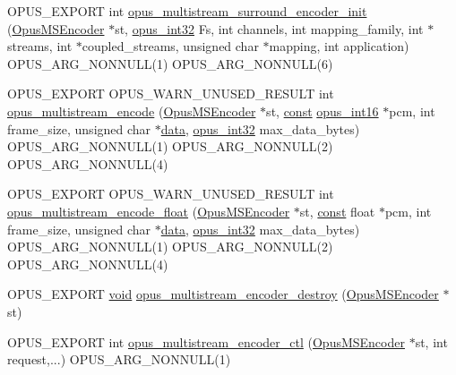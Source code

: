 \begin{DoxyCompactItemize}
\item 
O\+P\+U\+S\+\_\+\+E\+X\+P\+O\+RT int \hyperlink{group__opus__multistream_ga786d90cfe8f8b8f371b0137ac76b1559}{opus\+\_\+multistream\+\_\+surround\+\_\+encoder\+\_\+init} (\hyperlink{group__opus__multistream_gae5826674d142fc873ebc1d781c507dd7}{Opus\+M\+S\+Encoder} $\ast$st, \hyperlink{opus__types_8h_aa4d309d6f80b99dbabebc8f98879ab9a}{opus\+\_\+int32} Fs, int channels, int mapping\+\_\+family, int $\ast$streams, int $\ast$coupled\+\_\+streams, unsigned char $\ast$mapping, int application) O\+P\+U\+S\+\_\+\+A\+R\+G\+\_\+\+N\+O\+N\+N\+U\+LL(1) O\+P\+U\+S\+\_\+\+A\+R\+G\+\_\+\+N\+O\+N\+N\+U\+LL(6)
\item 
O\+P\+U\+S\+\_\+\+E\+X\+P\+O\+RT O\+P\+U\+S\+\_\+\+W\+A\+R\+N\+\_\+\+U\+N\+U\+S\+E\+D\+\_\+\+R\+E\+S\+U\+LT int \hyperlink{group__opus__multistream_ga5276a2212541e65624f52e906d3dff42}{opus\+\_\+multistream\+\_\+encode} (\hyperlink{group__opus__multistream_gae5826674d142fc873ebc1d781c507dd7}{Opus\+M\+S\+Encoder} $\ast$st, \hyperlink{zconf_8h_a2c212835823e3c54a8ab6d95c652660e}{const} \hyperlink{opus__types_8h_acc9ed7cf60479eb81f9648c6ec27dc26}{opus\+\_\+int16} $\ast$pcm, int frame\+\_\+size, unsigned char $\ast$\hyperlink{jpeglib_8h_aa379dc8ae39e55ae0c431a61a7d2f2bc}{data}, \hyperlink{opus__types_8h_aa4d309d6f80b99dbabebc8f98879ab9a}{opus\+\_\+int32} max\+\_\+data\+\_\+bytes) O\+P\+U\+S\+\_\+\+A\+R\+G\+\_\+\+N\+O\+N\+N\+U\+LL(1) O\+P\+U\+S\+\_\+\+A\+R\+G\+\_\+\+N\+O\+N\+N\+U\+LL(2) O\+P\+U\+S\+\_\+\+A\+R\+G\+\_\+\+N\+O\+N\+N\+U\+LL(4)
\item 
O\+P\+U\+S\+\_\+\+E\+X\+P\+O\+RT O\+P\+U\+S\+\_\+\+W\+A\+R\+N\+\_\+\+U\+N\+U\+S\+E\+D\+\_\+\+R\+E\+S\+U\+LT int \hyperlink{group__opus__multistream_gabc78b732d2e7b6ceb27c63888255ef56}{opus\+\_\+multistream\+\_\+encode\+\_\+float} (\hyperlink{group__opus__multistream_gae5826674d142fc873ebc1d781c507dd7}{Opus\+M\+S\+Encoder} $\ast$st, \hyperlink{zconf_8h_a2c212835823e3c54a8ab6d95c652660e}{const} float $\ast$pcm, int frame\+\_\+size, unsigned char $\ast$\hyperlink{jpeglib_8h_aa379dc8ae39e55ae0c431a61a7d2f2bc}{data}, \hyperlink{opus__types_8h_aa4d309d6f80b99dbabebc8f98879ab9a}{opus\+\_\+int32} max\+\_\+data\+\_\+bytes) O\+P\+U\+S\+\_\+\+A\+R\+G\+\_\+\+N\+O\+N\+N\+U\+LL(1) O\+P\+U\+S\+\_\+\+A\+R\+G\+\_\+\+N\+O\+N\+N\+U\+LL(2) O\+P\+U\+S\+\_\+\+A\+R\+G\+\_\+\+N\+O\+N\+N\+U\+LL(4)
\item 
O\+P\+U\+S\+\_\+\+E\+X\+P\+O\+RT \hyperlink{png_8h_ac9c84fa68bbad002983e35ce3663c686}{void} \hyperlink{group__opus__multistream_ga24b8a4ceb20a142069084cb1edd28a30}{opus\+\_\+multistream\+\_\+encoder\+\_\+destroy} (\hyperlink{group__opus__multistream_gae5826674d142fc873ebc1d781c507dd7}{Opus\+M\+S\+Encoder} $\ast$st)
\item 
O\+P\+U\+S\+\_\+\+E\+X\+P\+O\+RT int \hyperlink{group__opus__multistream_ga0f8756c84c7c62a38f99fb5cd6ed68af}{opus\+\_\+multistream\+\_\+encoder\+\_\+ctl} (\hyperlink{group__opus__multistream_gae5826674d142fc873ebc1d781c507dd7}{Opus\+M\+S\+Encoder} $\ast$st, int request,...) O\+P\+U\+S\+\_\+\+A\+R\+G\+\_\+\+N\+O\+N\+N\+U\+LL(1)
\end{DoxyCompactItemize}
